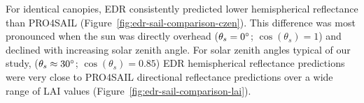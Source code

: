 For identical canopies, EDR consistently predicted lower hemispherical reflectance than PRO4SAIL (Figure~\ref{fig:edr-sail-comparison-czen}).
This difference was most pronounced when the sun was directly overhead ($\theta_{s} = 0^{\circ}$; $\cos(\theta_{s}) = 1$) and declined with increasing solar zenith angle.
For solar zenith angles typical of our study, ($\theta_{s} \approx 30^{\circ}$; $\cos(\theta_{s}) = 0.85$) EDR hemispherical reflectance predictions were very close to PRO4SAIL directional reflectance predictions over a wide range of LAI values (Figure~\ref{fig:edr-sail-comparison-lai}).
